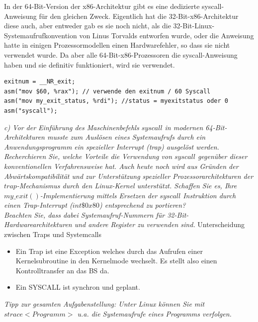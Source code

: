 \documentclass[a4paper]{article}
\begin{document}
\begin{itemize}
\begin{itemize*}
              \item In der 64-Bit-Version der x86-Architektur gibt es eine dedizierte syscall-Anweisung für den gleichen Zweck. Eigentlich hat die 32-Bit-x86-Architektur diese auch, aber entweder gab es sie noch nicht, als die 32-Bit-Linux-Systemaufrufkonvention von Linus Torvalds entworfen wurde, oder die Anweisung hatte in einigen Prozessormodellen einen Hardwarefehler, so dass sie nicht verwendet wurde. Da aber alle 64-Bit-x86-Prozessoren die syscall-Anweisung haben und sie definitiv funktioniert, wird sie verwendet.
          \end{itemize*}
\end{itemize}
\begin{lstlisting}
exitnum = __NR_exit;
asm("mov $60, %rax"); // verwende den exitnum / 60 Syscall
asm("mov my_exit_status, %rdi"); //status = myexitstatus oder 0 
asm("syscall");
\end{lstlisting}

\textit{c) Vor der Einführung des Maschinenbefehls $syscall$ in modernen 64-Bit-Architekturen musste zum Auslösen eines Systemaufrufs durch ein Anwendungsprogramm ein spezieller Interrupt (trap) ausgelöst werden. Recherchieren Sie, welche Vorteile die Verwendung von $syscall$ gegenüber dieser konventionellen Verfahrensweise hat. Auch heute noch wird aus Gründen der Abwärtskompatibilität und zur Unterstützung spezieller Prozessorarchitekturen der $trap$-Mechanismus durch den Linux-Kernel unterstützt. Schaffen Sie es, Ihre $my\_exit()$-Implementierung mittels Ersetzen der $syscall$ Instruktion durch einen Trap-Interrupt ($int \$ 0x80$) entsprechend zu portieren?\\
    Beachten Sie, dass dabei Systemaufruf-Nummern für 32-Bit-Hardwarearchitekturen und andere Register zu verwenden sind.
}
\vspace{10mm}
Unterscheidung zwischen Traps und Systemcalls
\begin{itemize}
    \item Ein Trap ist eine Exception welches durch das Aufrufen einer Kernelsubroutine in den Kernelmode wechselt. Es stellt also einen Kontrolltransfer an das BS da.
    \item Ein SYSCALL ist synchron und geplant.
\end{itemize}


\textit{Tipp zur gesamten Aufgabenstellung: Unter Linux können Sie mit $strace <Programm>$ u.a. die Systemaufrufe eines Programms verfolgen.}
\vspace{10mm}
\end{document}
